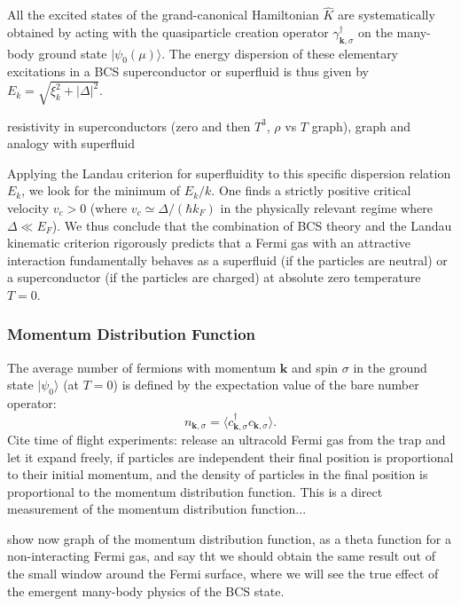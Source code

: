 All the excited states of the grand-canonical Hamiltonian \( \hat{K} \) are systematically obtained by acting with the quasiparticle creation operator \( \gamma_{\mathbf{k},\sigma}^\dagger \) on the many-body ground state \( |\psi_0(\mu)\rangle \). The energy dispersion of these elementary excitations in a BCS superconductor or superfluid is thus given by \( E_k = \sqrt{\xi_k^2 + |\Delta|^2} \).

resistivity in superconductors (zero and then \(T^3\), \(\rho\) vs \(T\) graph), graph and analogy with superfluid 


Applying the Landau criterion for superfluidity to this specific dispersion relation \( E_k \), we look for the minimum of \( E_k/k \). One finds a strictly positive critical velocity \( v_c > 0 \) (where \( v_c \simeq \Delta/(\hbar k_F) \) in the physically relevant regime where \( \Delta \ll E_F \)). We thus conclude that the combination of BCS theory and the Landau kinematic criterion rigorously predicts that a Fermi gas with an attractive interaction fundamentally behaves as a superfluid (if the particles are neutral) or a superconductor (if the particles are charged) at absolute zero temperature \( T = 0 \).

\subsubsection{Momentum Distribution Function}

The average number of fermions with momentum \( \mathbf{k} \) and spin \( \sigma \) in the ground state \( |\psi_0\rangle \) (at \( T = 0 \)) is defined by the expectation value of the bare number operator:
\[
    n_{\mathbf{k},\sigma} = \langle c_{\mathbf{k},\sigma}^\dagger c_{\mathbf{k},\sigma} \rangle.
\]
Cite time of flight experiments: release an ultracold Fermi gas from the trap and let it expand freely, if particles are independent their final position is proportional to their initial momentum, and the density of particles in the final position is proportional to the momentum distribution function. This is a direct measurement of the momentum distribution function...

show now graph of the momentum distribution function, as a theta function for a non-interacting Fermi gas, and say tht we should obtain the same result out of the small window around the Fermi surface, where we will see the true effect of the emergent many-body physics of the BCS state. 

